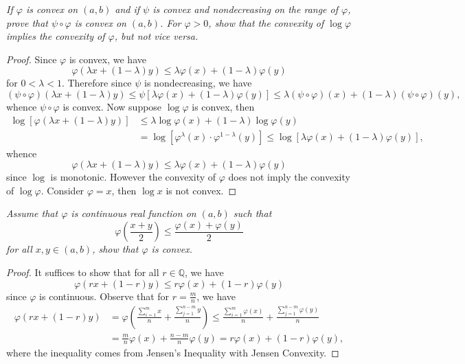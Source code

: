 \begin{problem}\em
If $\varphi$ is convex on $(a,b)$ and if $\psi$ is convex and nondecreasing on the range of $\varphi$, prove that $\psi\circ\varphi$ is convex on $(a,b)$. For $\varphi>0$, show that the convexity of $\log\varphi$ implies the convexity of $\varphi$, but not vice versa.
\end{problem}
\begin{proof}
Since $\varphi$ is convex, we have 
$$
\varphi \left( \lambda x+\left( 1-\lambda \right) y \right) \le \lambda \varphi \left( x \right) +\left( 1-\lambda \right) \varphi \left( y \right) 
$$
for $0<\lambda<1$. Therefore since $\psi$ is nondecreasing, we have 
$$
\left( \psi \circ \varphi \right) \left( \lambda x+\left( 1-\lambda \right) y \right) \le \psi \left[ \lambda \varphi \left( x \right) +\left( 1-\lambda \right) \varphi \left( y \right) \right] \le \lambda \left( \psi \circ \varphi \right) \left( x \right) +\left( 1-\lambda \right) \left( \psi \circ \varphi \right) \left( y \right) ,
$$
whence $\psi\circ\varphi$ is convex. Now suppose $\log\varphi$ is convex, then 
$$
\begin{aligned}
\log \left[ \varphi \left( \lambda x+\left( 1-\lambda \right) y \right) \right] &\le \lambda \log \varphi \left( x \right) +\left( 1-\lambda \right) \log \varphi \left( y \right) 
\\
&=\log \left[ \varphi ^{\lambda}\left( x \right) \cdot \varphi ^{1-\lambda}\left( y \right) \right] \le \log \left[ \lambda \varphi \left( x \right) +\left( 1-\lambda \right) \varphi \left( y \right) \right] ,
\end{aligned}
$$
whence 
$$
\varphi \left( \lambda x+\left( 1-\lambda \right) y \right) \le \lambda \varphi \left( x \right) +\left( 1-\lambda \right) \varphi \left( y \right) 
$$
since $\log$ is monotonic. However the convexity of $\varphi$ does not imply the convexity of $\log\varphi$. Consider $\varphi=x$, then $\log x$ is not convex.
\end{proof}
\begin{problem}\em
Assume that $\varphi$ is continuous real function on $(a,b)$ such that 
$$\varphi\left(\frac{x+y}{2}\right)\le\frac{\varphi(x)+\varphi(y)}{2}$$
for all $x,y\in (a,b)$, show that $\varphi$ is convex.
\end{problem}
\begin{proof}
It suffices to show that for all $r\in\mathbb{Q}$, we have 
$$
\varphi \left( rx+\left( 1-r \right) y \right) \le r\varphi \left( x \right) +\left( 1-r \right) \varphi \left( y \right) 
$$
since $\varphi$ is continuous. Observe that for $r=\frac{m}{n}$, we have 
$$
\begin{aligned}
\varphi \left( rx+\left( 1-r \right) y \right) &=\varphi \left( \frac{\sum_{i=1}^m{x}}{n}+\frac{\sum_{j=1}^{n-m}{y}}{n} \right) \le \frac{\sum_{i=1}^m{\varphi \left( x \right)}}{n}+\frac{\sum_{j=1}^{n-m}{\varphi \left( y \right)}}{n}
\\
&=\frac{m}{n}\varphi \left( x \right) +\frac{n-m}{n}\varphi \left( y \right) =r\varphi \left( x \right) +\left( 1-r \right) \varphi \left( y \right) ,
\end{aligned}
$$
where the inequality comes from Jensen's Inequality with Jensen Convexity.
\end{proof}
